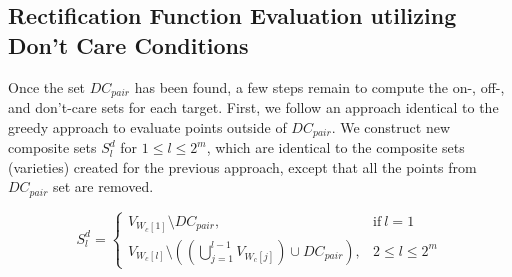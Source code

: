 
\subsection{Rectification Function Evaluation utilizing Don't Care Conditions}\label{comp:DFC2}

Once the set $DC_{pair}$ has been found, a few steps remain to compute the on-, off-, and don't-care sets for each target. First, we follow an approach identical to the greedy approach to evaluate points outside of $DC_{pair}$. We construct new composite sets $S_l^d$ for $1 \leq l \leq 2^m$, which are identical to the composite sets (varieties) created for the previous approach, except that all the points from $DC_{pair}$ set are removed.

\begin{equation}
  \label{eqn:composite_dc}
  S_l^d=
  \begin{cases}
    V_{W_c[1]} \setminus DC_{pair},                                                & \text{if}\ l=1   \\
    V_{W_c[l]} \setminus ((\bigcup\limits_{j=1}^{l-1}V_{W_c[j]}) \cup DC_{pair}), & 2\leq l \leq 2^m
  \end{cases}
\end{equation}

